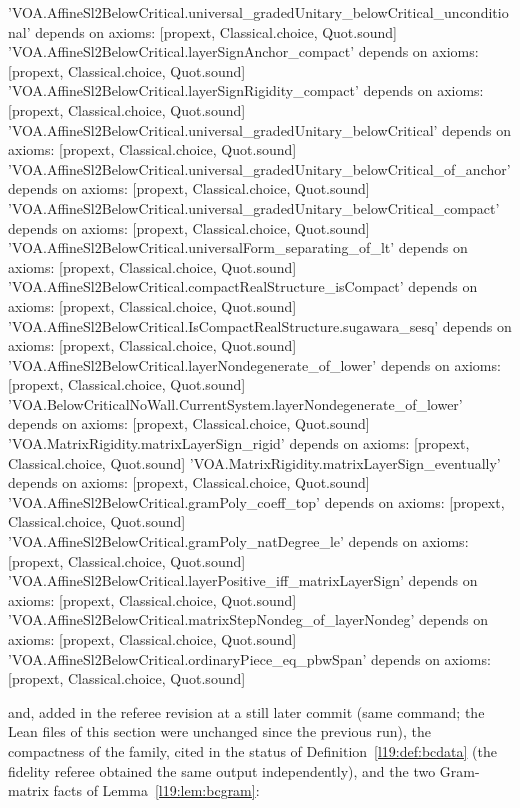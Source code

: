 \begin{plaincode}
'VOA.AffineSl2BelowCritical.universal_gradedUnitary_belowCritical_unconditional' depends on axioms: [propext, Classical.choice, Quot.sound]
'VOA.AffineSl2BelowCritical.layerSignAnchor_compact' depends on axioms: [propext, Classical.choice, Quot.sound]
'VOA.AffineSl2BelowCritical.layerSignRigidity_compact' depends on axioms: [propext, Classical.choice, Quot.sound]
'VOA.AffineSl2BelowCritical.universal_gradedUnitary_belowCritical' depends on axioms: [propext, Classical.choice, Quot.sound]
'VOA.AffineSl2BelowCritical.universal_gradedUnitary_belowCritical_of_anchor' depends on axioms: [propext, Classical.choice, Quot.sound]
'VOA.AffineSl2BelowCritical.universal_gradedUnitary_belowCritical_compact' depends on axioms: [propext, Classical.choice, Quot.sound]
'VOA.AffineSl2BelowCritical.universalForm_separating_of_lt' depends on axioms: [propext, Classical.choice, Quot.sound]
'VOA.AffineSl2BelowCritical.compactRealStructure_isCompact' depends on axioms: [propext, Classical.choice, Quot.sound]
'VOA.AffineSl2BelowCritical.IsCompactRealStructure.sugawara_sesq' depends on axioms: [propext, Classical.choice, Quot.sound]
'VOA.AffineSl2BelowCritical.layerNondegenerate_of_lower' depends on axioms: [propext, Classical.choice, Quot.sound]
'VOA.BelowCriticalNoWall.CurrentSystem.layerNondegenerate_of_lower' depends on axioms: [propext, Classical.choice, Quot.sound]
'VOA.MatrixRigidity.matrixLayerSign_rigid' depends on axioms: [propext, Classical.choice, Quot.sound]
'VOA.MatrixRigidity.matrixLayerSign_eventually' depends on axioms: [propext, Classical.choice, Quot.sound]
'VOA.AffineSl2BelowCritical.gramPoly_coeff_top' depends on axioms: [propext, Classical.choice, Quot.sound]
'VOA.AffineSl2BelowCritical.gramPoly_natDegree_le' depends on axioms: [propext, Classical.choice, Quot.sound]
'VOA.AffineSl2BelowCritical.layerPositive_iff_matrixLayerSign' depends on axioms: [propext, Classical.choice, Quot.sound]
'VOA.AffineSl2BelowCritical.matrixStepNondeg_of_layerNondeg' depends on axioms: [propext, Classical.choice, Quot.sound]
'VOA.AffineSl2BelowCritical.ordinaryPiece_eq_pbwSpan' depends on axioms: [propext, Classical.choice, Quot.sound]
\end{plaincode}

\noindent and, added in the referee revision at a still later commit (same command; the Lean files of this
section were unchanged since the previous run), the compactness of the family, cited in the status of
Definition~\ref{l19:def:bcdata} (the fidelity referee obtained the same output independently), and the two Gram-matrix facts of
Lemma~\ref{l19:lem:bcgram}:

